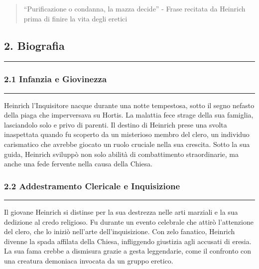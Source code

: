 \begin{quote}
``Purificazione o condanna, la mazza decide'' - Frase recitata da
Heinrich prima di finire la vita degli eretici
\end{quote}

\subsection{2. Biografia}\label{biografia}

\begin{center}\rule{0.5\linewidth}{0.5pt}\end{center}

\subsubsection{\texorpdfstring{2.1 \textbf{Infanzia e
Giovinezza}}{2.1 Infanzia e Giovinezza}}\label{infanzia-e-giovinezza}

\begin{center}\rule{0.5\linewidth}{0.5pt}\end{center}

Heinrich l'Inquisitore nacque durante una notte tempestosa, sotto il
segno nefasto della piaga che imperversava su Hortis. La malattia fece
strage della sua famiglia, lasciandolo solo e privo di parenti. Il
destino di Heinrich prese una svolta inaspettata quando fu scoperto da
un misterioso membro del clero, un individuo carismatico che avrebbe
giocato un ruolo cruciale nella sua crescita. Sotto la sua guida,
Heinrich sviluppò non solo abilità di combattimento straordinarie, ma
anche una fede fervente nella causa della Chiesa.

\subsubsection{\texorpdfstring{2.2 \textbf{Addestramento Clericale e
Inquisizione}}{2.2 Addestramento Clericale e Inquisizione}}\label{addestramento-clericale-e-inquisizione}

\begin{center}\rule{0.5\linewidth}{0.5pt}\end{center}

Il giovane Heinrich si distinse per la sua destrezza nelle arti marziali
e la sua dedizione al credo religioso. Fu durante un evento celebrale
che attirò l'attenzione del clero, che lo iniziò nell'arte
dell'inquisizione. Con zelo fanatico, Heinrich divenne la spada affilata
della Chiesa, infliggendo giustizia agli accusati di eresia. La sua fama
crebbe a dismisura grazie a gesta leggendarie, come il confronto con una
creatura demoniaca invocata da un gruppo eretico.

